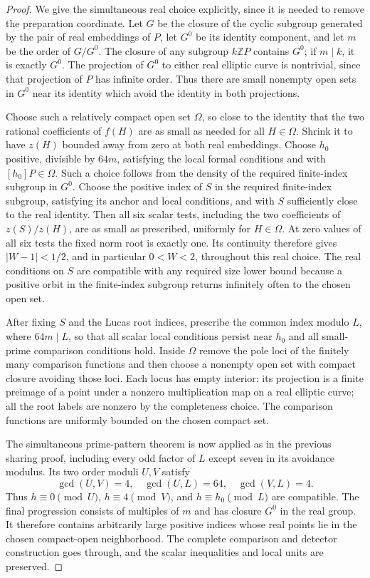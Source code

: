 \documentclass[11pt]{article}
\theoremstyle{definition}
\begin{document}
\begin{proof}
We give the simultaneous real choice explicitly, since it is needed
to remove the preparation coordinate.  Let $G$ be the closure of
the cyclic subgroup generated by the pair of real embeddings of
$P$, let $G^0$ be its identity component, and let $m$ be the order
of $G/G^0$.  The closure of any subgroup $k\mathbb ZP$ contains
$G^0$; if $m\mid k$, it is exactly $G^0$.  The projection of
$G^0$ to either real elliptic curve is nontrivial, since that
projection of $P$ has infinite order.  Thus there are small
nonempty open sets in $G^0$ near its identity which avoid the
identity in both projections.

Choose such a relatively compact open set $\Omega$, so close to
the identity that the two rational coefficients of $f(H)$ are
as small as needed for all $H\in\Omega$.  Shrink it to have
$z(H)$ bounded away from zero at both real embeddings.  Choose
$h_0$ positive, divisible by $64m$, satisfying the local formal
conditions and with $[h_0]P\in\Omega$.  Such a choice follows
from the density of the required finite-index subgroup in $G^0$.
Choose the positive index of $S$ in the required finite-index
subgroup, satisfying its anchor and local conditions, and with
$S$ sufficiently close to the real identity.  Then all six scalar
tests, including the two coefficients of $z(S)/z(H)$, are as small
as prescribed, uniformly for $H\in\Omega$.  At zero values of
all six tests the fixed norm root is exactly one.  Its continuity
therefore gives $|W-1|<1/2$, and in particular $0<W<2$, throughout
this real choice.  The real
conditions on $S$ are compatible with any required size lower
bound because a positive orbit in the finite-index subgroup
returns infinitely often to the chosen open set.

After fixing $S$ and the Lucas root indices, prescribe the common
index modulo $L$, where $64m\mid L$, so that all scalar local
conditions persist near $h_0$ and all small-prime comparison
conditions hold.  Inside $\Omega$ remove the pole loci of the
finitely many comparison functions and then choose a nonempty
open set with compact closure avoiding those loci.  Each locus
has empty interior: its projection is a finite preimage of a
point under a nonzero multiplication map on a real elliptic
curve; all the root labels are nonzero by the completeness choice.
The comparison functions are uniformly bounded on the
chosen compact set.

The simultaneous prime-pattern theorem is now applied as in the
previous sharing proof, including every odd factor of $L$ except
seven in its avoidance modulus.  Its two order moduli $U,V$
satisfy
\[
 \gcd(U,V)=4,\quad \gcd(U,L)=64,\quad \gcd(V,L)=4.
\]
Thus $h\equiv0\pmod U$, $h\equiv4\pmod V$, and
$h\equiv h_0\pmod L$ are compatible.  The final progression
consists of multiples of $m$ and has closure $G^0$ in the real
group.  It therefore contains arbitrarily large positive indices
whose real points lie in the chosen compact-open neighborhood.
The complete comparison and detector construction goes through,
and the scalar inequalities and local units are preserved.


\end{proof}
\end{document}
